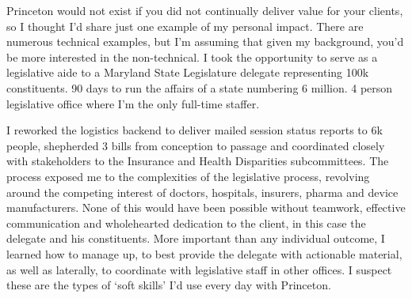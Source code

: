 \documentclass[a4paper]{../res}
\begin{document}
\begin{sloppypar}
\begin{resume}
Princeton would not exist if you did not continually deliver value for your clients, so I thought I'd share just one example of my personal impact. There are numerous technical examples, but I'm assuming that given my background, you'd be more interested in the non-technical. I took the opportunity to serve as a legislative aide to a Maryland State Legislature delegate representing 100k constituents. 90 days to run the affairs of a state numbering 6 million. 4 person legislative office where I'm the only full-time staffer.

I reworked the logistics backend to deliver mailed session status reports to 6k people, shepherded 3 bills from conception to passage and coordinated closely with stakeholders to the Insurance and Health Disparities subcommittees. The process exposed me to the complexities of the legislative process, revolving around the competing interest of doctors, hospitals, insurers, pharma and device manufacturers. None of this would have been possible without teamwork, effective communication and wholehearted dedication to the client, in this case the delegate and his constituents. More important than any individual outcome, I learned how to manage up, to best provide the delegate with actionable material, as well as laterally, to coordinate with legislative staff in other offices. I suspect these are the types of `soft skills' I'd use every day with Princeton.







\end{resume}
\end{sloppypar}
\end{document}
